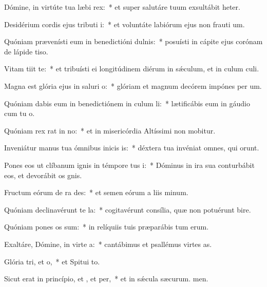 \item Dómine, in virtúte tua læbi rex:~* et super salutáre tuum exsultábit heter.
\item Desidérium cordis ejus tributi i:~* et voluntáte labiórum ejus non frauti um.
\item Quóniam prævenísti eum in benedictióni dulnis:~* posuísti in cápite ejus corónam de lápide tiso.
\item Vitam tiit  te:~* et tribuísti ei longitúdinem diérum in sǽculum, et in culum culi.
\item Magna est glória ejus in saluri o:~* glóriam et magnum decórem impónes per um.
\item Quóniam dabis eum in benedictiónem in culum li:~* lætificábis eum in gáudio cum tu o.
\item Quóniam rex rat in no:~* et in misericórdia Altíssimi non mobitur.
\item Inveniátur manus tua ómnibus inicis is:~* déxtera tua invéniat omnes, qui  orunt.
\item Pones eos ut clíbanum ignis in témpore tus i:~* Dóminus in ira sua conturbábit eos, et devorábit os gnis.
\item Fructum eórum de ra des:~* et semen eórum a liis minum.
\item Quóniam declinavérunt  te la:~* cogitavérunt consília, quæ non potuérunt bire.
\item Quóniam pones os sum:~* in relíquiis tuis præparábis tum erum.
\item Exaltáre, Dómine, in virte a:~* cantábimus et psallémus virtes as.
\item Glória tri, et o,~* et Spitui to.
\item Sicut erat in princípio, et , et per,~* et in sǽcula sæcurum. men.
